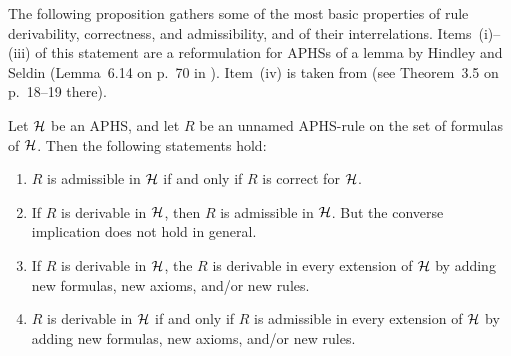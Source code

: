 \documentclass[envcountsame,runningheads]{llncs}
\newcommand{\APHS}{A\hspace*{-0.3pt}P\hspace*{-0.6pt}H\hspace*{-0.4pt}S}
\newcommand{\aAPHS}{{\cal H}}
\newcommand{\aunnamedRule}{R}
\begin{document}
The following proposition gathers some of the most basic properties of
rule derivability, correctness, and admissibility, and of their interrelations.
Items~(i)--(iii) of this statement are a reformulation for \APHS{s} of 
a lemma by Hindley and Seldin (Lemma~6.14 on p.~70 in \cite{hind:seld:1986}).
Item~(iv) is taken from \cite{grab:2003} (see Theorem~3.5 on p.~18--19 there).


\begin{proposition}
Let $\aAPHS$ be an \APHS, and let $\aunnamedRule$ be an unnamed \APHS-rule
  on the set of formulas of $\aAPHS$. Then the following statements hold:
\begin{enumerate}
    \renewcommand{\labelenumi}{(\roman{enumi})}
\item $\aunnamedRule$ is admissible in $\aAPHS$ if and only
      if $\aunnamedRule$ is correct for $\aAPHS$.
\item If $\aunnamedRule$ is derivable in $\aAPHS$, 
      then $\aunnamedRule$ is admissible in $\aAPHS$. But the converse
      implication does not hold in general.
\item If $\aunnamedRule$ is derivable in $\aAPHS$, the
      $\aunnamedRule$ is derivable in every extension of $\aAPHS$ by
      adding new formulas, new axioms, and/or new rules. 
\item $\aunnamedRule$ is derivable in $\aAPHS$ if and only if
      $\aunnamedRule$ is admissible in every extension of $\aAPHS$ by
      adding new formulas, new axioms, and/or new rules. 
\end{enumerate}
\end{proposition}
\end{document}
